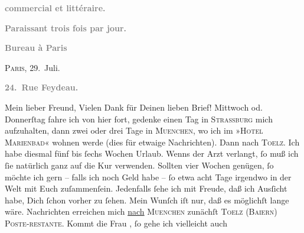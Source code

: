 \begin{ledgroupsized}[t]{13cm}
           \pstart
           \begin{otherlanguage}{french}\textcolor{gray}{\textbf{commercial et littéraire.}}\end{otherlanguage}\pend
           \pstart
           \begin{otherlanguage}{french}\textcolor{gray}{\textbf{\textbf{Paraissant trois fois par jour.}}}\end{otherlanguage}\pend
           \pstart
           \begin{otherlanguage}{french}\textcolor{gray}{\textbf{\textbf{Bureau à Paris}}}\end{otherlanguage}\hfill \textsc{Paris}, 29. Juli.\pend
           \pstart
           \begin{otherlanguage}{french}\textcolor{gray}{\textbf{\textbf{24. Rue Feydeau.}}}\end{otherlanguage}\pend
           \pstart\center{}Mein lieber Freund,\pend\pstart
           Vielen Dank für Deinen lieben Brief! \pend
           \pstart
           Mittwoch od. Donnerſtag
               fahre ich von hier fort, gedenke einen Tag in \textsc{Strassburg} mich aufzuhalten, dann zwei oder drei Tage in \textsc{Muenchen}, wo ich im »\textsc{Hotel Marienbad}« wohnen werde (dies für etwaige Nachrichten). Dann nach \textsc{Toelz}. Ich habe diesmal {\pb}fünf bis ſechs Wochen
               Urlaub. Wenns der Arzt verlangt, ſo muß ich ſie natürlich ganz auf die Kur verwenden.
               Sollten vier Wochen genügen, ſo möchte ich gern – falls ich noch Geld habe – ſo etwa
               acht Tage irgendwo in der Welt mit Euch zuſammenſein. Jedenfalls ſehe ich mit Freude,
               daß ich Ausſicht habe, Dich ſchon vorher zu ſehen. Mein Wunſch iſt nur, daß es
               möglichſt lange wäre. Nachrichten erreichen mich {\pb}\uline{nach}{ }\textsc{Muenchen} zunächſt \textsc{Toelz} (\textsc{Baiern}) \textsc{Poste-restante}. Kommt die Frau \label{K_L02742-1v}\label{K_L02742-1h}, ſo gehe ich vielleicht auch

\end{ledgroupsized}
